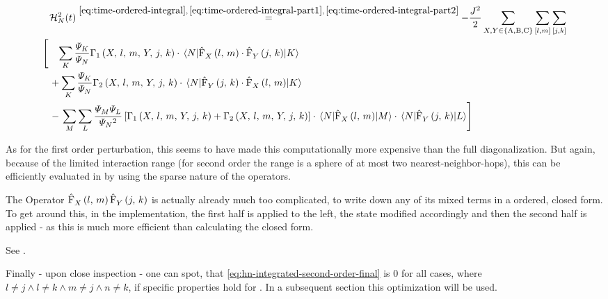 \begin{equation}
    \label{eq:hn-integrated-second-order-final}
    \begin{split}
        &\HNOftOrder{2} \stackrel{\ref{eq:time-ordered-integral},\,\ref{eq:time-ordered-integral-part1},\,\ref{eq:time-ordered-integral-part2}}{=} 
        - \frac{J^2}{2} 
        \lsum[X,Y \in \left\{\text{A}, \text{B}, \text{C}\right\}] \fullneighborsum{l}{m}\fullneighborsum{j}{k}\\
        \left[         \vphantom{\lsum[K]}        \right.
        &\phantom{+}
        \lsum[K]
        \frac{\psiN[K]}{\psiN} 
        \Gamma_1 \left(X,\,l,\,m,\,Y,\,j,\,k\right)
        \cdot 
        \bracketHelper{N}{
            \VhamiltonianOperatorPart[]{$X$}{l}{m}
            \cdot 
            \VhamiltonianOperatorPart[]{$Y$}{j}{k}
            }{K}
        \\
        &+ 
        \lsum[K]
        \frac{\psiN[K]}{\psiN} 
        \Gamma_2 \left(X,\,l,\,m,\,Y,\,j,\,k\right)
        \cdot 
        \bracketHelper{N}{
            \VhamiltonianOperatorPart[]{$Y$}{j}{k}
        \cdot 
            \VhamiltonianOperatorPart[]{$X$}{l}{m}
        }{K} \\
        &-
        \left.
        \lsum[M]\lsum[L]
        \frac{\psiN[M]\psiN[L]}{\psiN{}^2}
            \left[\Gamma_1 \left(X,\,l,\,m,\,Y,\,j,\,k\right) + \Gamma_2 \left(X,\,l,\,m,\,Y,\,j,\,k\right)\right] \cdot
            \bracketHelper{N}{\VhamiltonianOperatorPart{$X$}{l}{m}}{M}
            \cdot
            \bracketHelper{N}{\VhamiltonianOperatorPart{$Y$}{j}{k}}{L}
        \right]
        \hspace{-1cm} %
    \end{split}
\end{equation}

As for the first order perturbation, this seems to have made this computationally more expensive than the full diagonalization.
But again, because of the limited interaction range (for second order the range is a sphere of at most two nearest-neighbor-hops), this can be efficiently evaluated in 
 by using the sparse nature of the operators.

The Operator $\VhamiltonianOperatorPart[]{$X$}{l}{m}\VhamiltonianOperatorPart[]{$Y$}{j}{k}$ is actually already much too complicated, to write down any of its mixed terms in a ordered, closed form.
To get around this, in the implementation, the first half is applied to the left, the state modified accordingly and then the second half is applied - as this is much more efficient than calculating the closed form.

See .

Finally - upon close inspection - one can spot, that \autoref{eq:hn-integrated-second-order-final} is $0$ for all cases, where $l \neq j \land l \neq k \land m \neq j \land n \neq k$, if specific properties hold for \psiN[\ast].
In a subsequent section this optimization will be used.